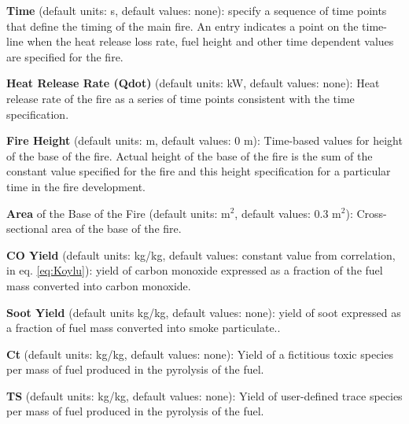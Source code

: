 \textbf{Time} (default units: s, default values: none): specify a sequence of time points that define the timing of the main fire.  An entry indicates a point on the time-line when the heat release loss rate, fuel height and other time dependent values are specified for the fire.

\textbf{Heat Release Rate (Qdot)} (default units: kW, default values: none): Heat release rate of the fire as a series of time points consistent with the time specification.

\textbf{Fire Height} (default units: m, default values: 0 m): Time-based values for height of the base of the fire.  Actual height of the base of the fire is the sum of the constant value specified for the fire and this height specification for a particular time in the fire development.

\textbf{Area} of the Base of the Fire (default units: m$^2$, default values: 0.3 m$^2$): Cross-sectional area of the base of the fire.

\textbf{CO Yield} (default units: kg/kg, default values: constant value from correlation, in eq. \ref{eq:Koylu}): yield of carbon monoxide expressed as a fraction of the fuel mass converted into carbon monoxide.

\textbf{Soot Yield} (default units kg/kg, default values: none): yield of soot expressed as a fraction of fuel mass converted into smoke particulate..

\textbf{Ct} (default units: kg/kg, default values: none): Yield of a fictitious toxic species per mass of fuel produced in the pyrolysis of the fuel.

\textbf{TS} (default units: kg/kg, default values: none): Yield of user-defined trace species per mass of fuel produced in the pyrolysis of the fuel.

